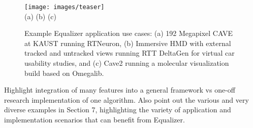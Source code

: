 \documentclass[10pt,journal,compsoc]{IEEEtran}
\begin{document}
%
\IEEEpeerreviewmaketitle

\begin{figure}[ht]\center
  \texttt{[image: images/teaser]} \\
  (a) \hfil \hfil (b) \hfil \hfil (c)
  \vspace{-2mm}
  \caption{Example Equalizer application use cases: (a) 192 Megapixel CAVE at
    KAUST running RTNeuron, (b) Immersive HMD with external tracked and
    untracked views running RTT DeltaGen for virtual car usability studies, and (c)
    Cave2 running a molecular visualization build based on Omegalib.}
  \label{FIG_teaser}
\end{figure}



Highlight integration of many features into a general framework vs one-off
research implementation of one algorithm. Also point out the various and very
diverse examples in Section 7, highlighting the variety of application and implementation
scenarios that can benefit from Equalizer.
\end{document}
